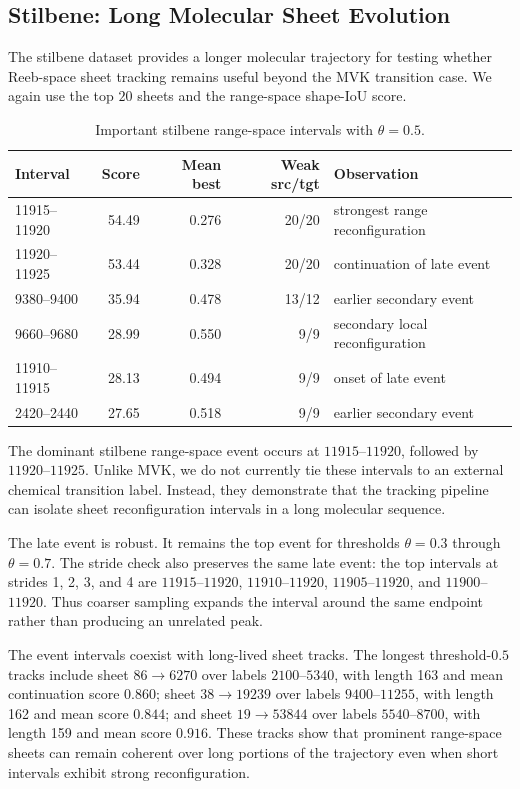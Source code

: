 \documentclass{vgtc}
\begin{document}
\subsection{Stilbene: Long Molecular Sheet Evolution}
\label{sec:results-stilbene}

The stilbene dataset provides a longer molecular trajectory for testing whether Reeb-space sheet tracking remains useful beyond the MVK transition case. We again use the top $20$ sheets and the range-space shape-IoU score.

\begin{table}[t]
  \centering
  \caption{Important stilbene range-space intervals with $\theta=0.5$.}
  \label{tab:stilbene-events}
  \begin{tabular}{lrrrl}
    \toprule
    Interval & Score & Mean best & Weak src/tgt & Observation \\
    \midrule
    11915--11920 & 54.49 & 0.276 & 20/20 & strongest range reconfiguration \\
    11920--11925 & 53.44 & 0.328 & 20/20 & continuation of late event \\
    9380--9400 & 35.94 & 0.478 & 13/12 & earlier secondary event \\
    9660--9680 & 28.99 & 0.550 & 9/9 & secondary local reconfiguration \\
    11910--11915 & 28.13 & 0.494 & 9/9 & onset of late event \\
    2420--2440 & 27.65 & 0.518 & 9/9 & earlier secondary event \\
    \bottomrule
  \end{tabular}
\end{table}

The dominant stilbene range-space event occurs at $11915$--$11920$, followed by $11920$--$11925$. Unlike MVK, we do not currently tie these intervals to an external chemical transition label. Instead, they demonstrate that the tracking pipeline can isolate sheet reconfiguration intervals in a long molecular sequence.

The late event is robust. It remains the top event for thresholds $\theta=0.3$ through $\theta=0.7$. The stride check also preserves the same late event: the top intervals at strides 1, 2, 3, and 4 are $11915$--$11920$, $11910$--$11920$, $11905$--$11920$, and $11900$--$11920$. Thus coarser sampling expands the interval around the same endpoint rather than producing an unrelated peak.

The event intervals coexist with long-lived sheet tracks. The longest threshold-$0.5$ tracks include sheet $86\rightarrow6270$ over labels $2100$--$5340$, with length 163 and mean continuation score $0.860$; sheet $38\rightarrow19239$ over labels $9400$--$11255$, with length 162 and mean score $0.844$; and sheet $19\rightarrow53844$ over labels $5540$--$8700$, with length 159 and mean score $0.916$. These tracks show that prominent range-space sheets can remain coherent over long portions of the trajectory even when short intervals exhibit strong reconfiguration.
\end{document}
